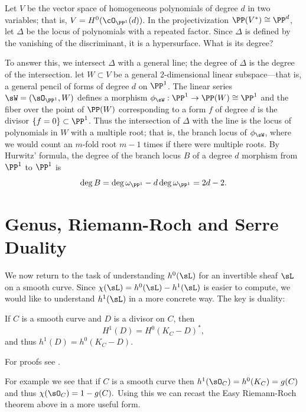 \begin{example}
 Let $V$ be the vector space of homogeneous polynomials of degree $d$ in two variables; that is, $V = H^0(\cO_{\PP^1}(d))$. In the projectivization $\PP(V^{*}) \cong \PP^d$, let $\Delta$ be the locus of polynomials with a repeated factor. Since $\Delta$ is defined by the vanishing of the discriminant, it is a hypersurface. What is its degree?
 
 To answer this, we intersect $\Delta$ with a general line; the degree of $\Delta$ is the degree of the intersection.  let $W\subset V$ be a general 2-dimensional linear subspace---that is, a general pencil of forms of degree $d$ on $\PP^1$. The linear series $\sW = (\sO_{\PP^{1}}, W)$ defines a morphism $\phi_{\sW} : \PP^{1} \to \PP(W) \cong \PP^{1}$ and the fiber over the point of $\PP(W)$ corresponding to a form $f$ of degree $d$ is the divisor $\{f = 0\}\subset \PP^{1}$. Thus the intersection of $\Delta$ with the line is the locus of polynomials in $W$ with a multiple root; that is, the branch locus of $\phi_{\sW}$, where we would count an $m$-fold root $m-1$ times if there were multiple roots.
 By Hurwitz' formula, the degree of the branch locus $B$ of a degree $d$ morphism from $\PP^{1}$ to $\PP^{1}$ is
 $$
 \deg B = \deg \omega_{\PP^{1}} - d\deg \omega_{\PP^{1}} = 2d-2.
 $$
 \end{example}
  

\section{Genus, Riemann-Roch and Serre Duality}

We now return to the task of understanding $h^0(\sL)$ for an invertible sheaf $\sL$ on a smooth curve. Since $\chi(\sL) = h^0(\sL)-h^1(\sL)$ is easier to compute, we would like to understand $h^1(\sL)$ in a more concrete way. The key is duality:
 
\begin{theorem}\label{sd}
If $C$ is a smooth curve and $D$ is a divisor on $C$, then
$$
H^1(D) =H^0(K_C-D)^*,
$$
and thus $h^1(D) = h^0(K_C-D)$.
\end{theorem}

For proofs see \cite[Theorem III.5.2 and III.7.6]{H}. 

For example we see that if $C$ is a smooth curve then $h^1 (\sO_C) = h^0(K_C) = g(C)$ and thus $\chi(\sO_C) = 1-g(C).$   
Using this we can recast the Easy Riemann-Roch theorem above in a more useful form. 

